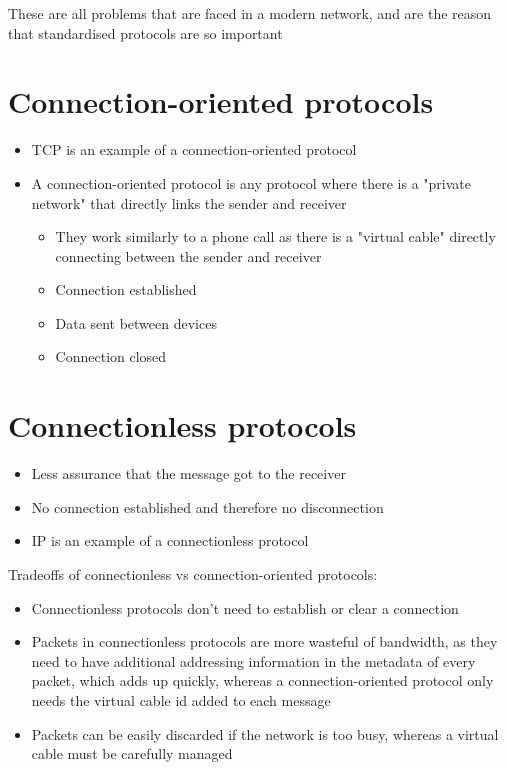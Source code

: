 These are all problems that are faced in a modern network, and are the reason that standardised protocols are so important

\section*{Connection-oriented protocols}

\begin{itemize}
  \item TCP is an example of a connection-oriented protocol
  \item A connection-oriented protocol is any protocol where there is a "private network" that directly links the sender and receiver
  \begin{itemize}
    \item They work similarly to a phone call as there is a "virtual cable" directly connecting between the sender and receiver
    \item Connection established
    \item Data sent between devices
    \item Connection closed
  \end{itemize}
\end{itemize}

\section*{Connectionless protocols}

\begin{itemize}
  \item Less assurance that the message got to the receiver
  \item No connection established and therefore no disconnection
  \item IP is an example of a connectionless protocol
\end{itemize}

Tradeoffs of connectionless vs connection-oriented protocols:
\begin{itemize}
  \item Connectionless protocols don't need to establish or clear a connection
  \item Packets in connectionless protocols are more wasteful of bandwidth, as they need to have additional addressing information in the metadata of every packet, which adds up quickly, whereas a connection-oriented protocol only needs the virtual cable id added to each message
  \item Packets can be easily discarded if the network is too busy, whereas a virtual cable must be carefully managed
\end{itemize}

